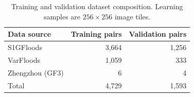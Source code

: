 \begin{table}[htbp]
\centering
\ifdefined\cnexperimenttableformat\cnexperimenttableformat\fi
\captionsetup{name=Table}
\caption{Training and validation dataset composition. Learning samples are \(256\times256\) image tiles.}
\label{tab:training_split}
\small
\begin{tabular}{lrr}
\toprule
Data source & Training pairs & Validation pairs \\
\midrule
S1GFloods & 3,664 & 1,256 \\
VarFloods & 1,059 & 333 \\
Zhengzhou (GF3) & 6 & 4 \\
\midrule
Total & 4,729 & 1,593 \\
\bottomrule
\end{tabular}
\end{table}
